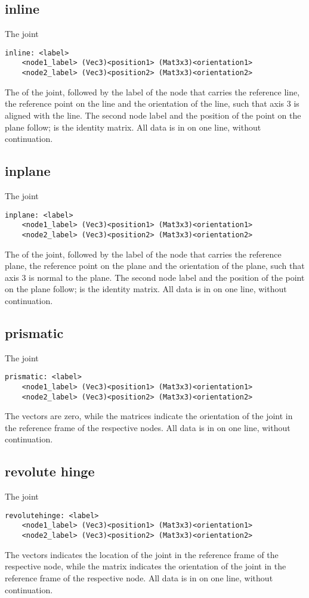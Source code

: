 \subsection{inline}
The  joint
\begin{verbatim}
inline: <label>
    <node1_label> (Vec3)<position1> (Mat3x3)<orientation1>
    <node2_label> (Vec3)<position2> (Mat3x3)<orientation2>
\end{verbatim}
The  of the joint, followed by the label of the node
that carries the reference line, the reference point 
on the line and the orientation  of the line,
such that axis 3 is aligned with the line.
The second node label and the position of the point on the plane
follow;  is the identity matrix.
All data is in on one line, without continuation.

\subsection{inplane}
The  joint
\begin{verbatim}
inplane: <label>
    <node1_label> (Vec3)<position1> (Mat3x3)<orientation1>
    <node2_label> (Vec3)<position2> (Mat3x3)<orientation2>
\end{verbatim}
The  of the joint, followed by the label of the node
that carries the reference plane, the reference point 
on the plane and the orientation  of the plane,
such that axis 3 is normal to the plane.
The second node label and the position of the point on the plane
follow;  is the identity matrix.
All data is in on one line, without continuation.

\subsection{prismatic}
The  joint
\begin{verbatim}
prismatic: <label>
    <node1_label> (Vec3)<position1> (Mat3x3)<orientation1>
    <node2_label> (Vec3)<position2> (Mat3x3)<orientation2>
\end{verbatim}
The  vectors are zero,
while the  matrices indicate the orientation 
of the joint in the reference frame of the respective nodes.
All data is in on one line, without continuation.

\subsection{revolute hinge}
The  joint
\begin{verbatim}
revolutehinge: <label>
    <node1_label> (Vec3)<position1> (Mat3x3)<orientation1>
    <node2_label> (Vec3)<position2> (Mat3x3)<orientation2>
\end{verbatim}
The  vectors indicates the location of the joint
in the reference frame of the respective node,
while the matrix  indicates the orientation of the joint
in the reference frame of the respective node.
All data is in on one line, without continuation.

